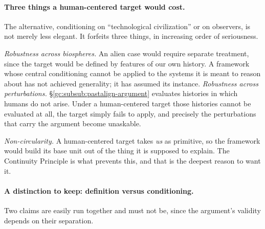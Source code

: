 \paragraph{Three things a human-centered target would cost.}\label{gc:rem:privilegecost}
The alternative, conditioning on ``technological civilization'' or on
observers, is not merely less elegant. It forfeits three things, in
increasing order of seriousness.

\emph{Robustness across biospheres.} An alien case would require
separate treatment, since the target would be defined by features of our
own history. A framework whose central conditioning cannot be applied to
the systems it is meant to reason about has not achieved generality; it
has assumed its instance. \emph{Robustness across perturbations.} \S\ref{gc:subsub:pastalign-argument}
evaluates histories in which humans do not arise. Under a human-centered
target those histories cannot be evaluated at all, the target simply
fails to apply, and precisely the perturbations that carry the
argument become unaskable.

\emph{Non-circularity.} A human-centered target takes \emph{us} as
primitive, so the framework would build its base unit out of the thing
it is supposed to explain. The Continuity Principle is what prevents
this, and that is the deepest reason to want it.

\paragraph{A distinction to keep: definition versus conditioning.}\label{gc:rem:defvscond}
Two claims are easily run together and must not be, since the argument's
validity depends on their separation.

